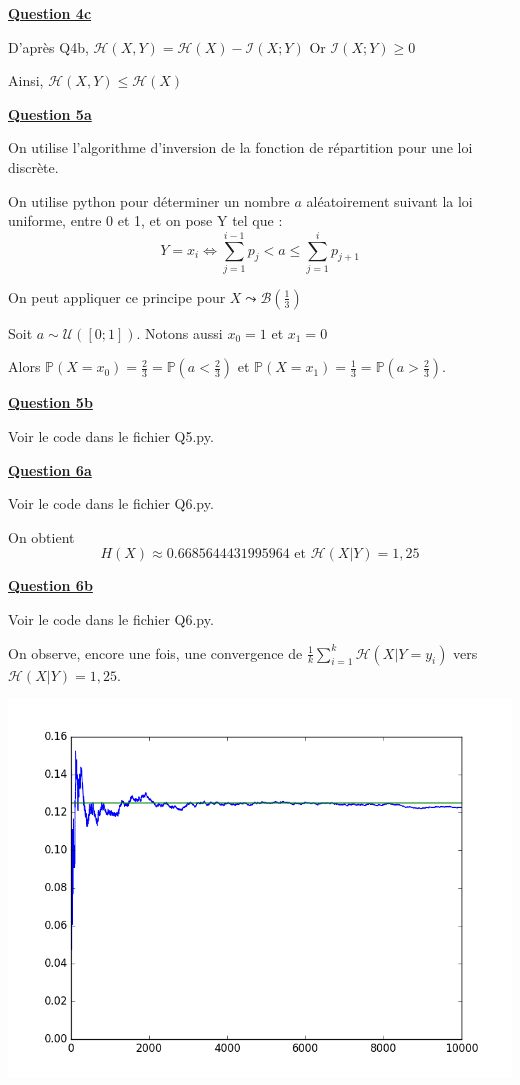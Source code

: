 \documentclass[a4paper,twoside,10pt]{article}
\renewcommand{\H}{\mathcal{H}}
\newcommand{\I}{\mathcal{I}}
\newcommand{\B}{\mathcal{B}}
\newenvironment{Q}[1]{%
\vspace{1ex}
\underline{\textbf{Question #1\\}}
\newline
}{
\vspace{2ex}
}
\begin{document}
\begin{Q}{4c}

D'après Q4b, $\H(X,Y) = \H(X) - \I(X;Y)$ Or $\I(X;Y) \geq 0$

Ainsi, $\H(X,Y) \leq \H(X)$
\end{Q}

\begin{Q}{5a}

On utilise l'algorithme d'inversion de la fonction de répartition pour une loi discrète.

On utilise python pour déterminer un nombre $a$ aléatoirement suivant la loi uniforme, entre 0 et 1, et on pose Y tel que : 
\[
Y = x_i  \iff \sum_{j = 1}^{i-1} p_j < a \leq \sum_{j = 1}^{i} p_{j+1}
\]

On peut appliquer ce principe pour $X \leadsto \B(\frac{1}{3})$

Soit $a \sim \mathcal{U}([0;1])$. Notons aussi $x_0 = 1$ et $x_1 = 0$

Alors $\mathbb{P}(X = x_0) = \frac{2}{3} = \mathbb{P}(a < \frac{2}{3})$ et 
$\mathbb{P}(X = x_1) = \frac{1}{3} = \mathbb{P}(a > \frac{2}{3})$.
\end{Q}

\begin{Q}{5b}
Voir le code dans le fichier Q5.py.
\end{Q}

\begin{Q}{6a}
Voir le code dans le fichier Q6.py.

On obtient \[H(X) \approx 0.6685644431995964 \text{ et } \H(X|Y) = 1,25\]
\end{Q}

\begin{Q}{6b}
Voir le code dans le fichier Q6.py.

On observe, encore une fois, une convergence de $\frac{1}{k} \sum_{i = 1}^{k} \H(X|Y = y_i)$ vers $\H(X|Y) = 1,25$.

\begin{center}
\includegraphics[width=\textwidth]{Q6b.png}
\end{center}

\end{Q}
\end{document}
